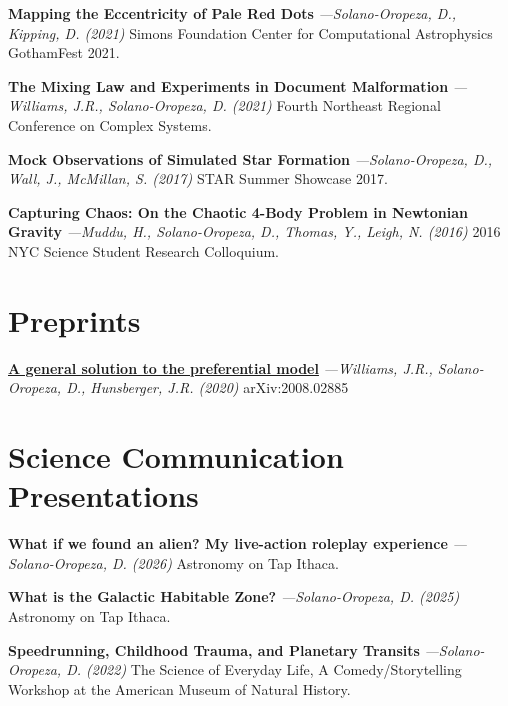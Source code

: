 \documentclass[a4paper,11pt]{article}
\begin{document}
    \textbf{Mapping the Eccentricity of Pale Red Dots} \textit{—Solano-Oropeza, D., Kipping, D. (2021)} Simons Foundation Center for Computational Astrophysics GothamFest 2021.
    \vspace{1.5mm}
    
    \textbf{The Mixing Law and Experiments in Document Malformation} \textit{—Williams, J.R., Solano-Oropeza, D. (2021)} Fourth Northeast Regional Conference on Complex Systems.
    \vspace{1.5mm}
    
    \textbf{Mock Observations of Simulated Star Formation} \textit{—Solano-Oropeza, D., Wall, J., McMillan, S. (2017)} STAR Summer Showcase 2017.
    \vspace{1.5mm}
    
    \textbf{Capturing Chaos: On the Chaotic 4-Body Problem in Newtonian Gravity} \textit{—Muddu, H., Solano-Oropeza, D., Thomas, Y., Leigh, N. (2016)} 2016 NYC Science Student Research Colloquium.
    
\section{Preprints}
    {\href{https://arxiv.org/abs/2008.02885}{\textbf{A general solution to the preferential model}}} \textit{—Williams, J.R., Solano-Oropeza, D., Hunsberger, J.R. (2020)} arXiv:2008.02885

\section{Science Communication Presentations}

    \textbf{What if we found an alien? My live-action roleplay experience} \textit{—Solano-Oropeza, D. (2026)} Astronomy on Tap Ithaca.
    \vspace{1.5mm}

    \textbf{What is the Galactic Habitable Zone?} \textit{—Solano-Oropeza, D. (2025)} Astronomy on Tap Ithaca.
    \vspace{1.5mm}
    
    \textbf{Speedrunning, Childhood Trauma, and Planetary Transits} \textit{—Solano-Oropeza, D. (2022)} The Science of Everyday Life, A Comedy/Storytelling Workshop at the American Museum of Natural History.
    \vspace{1.5mm}
\end{document}
